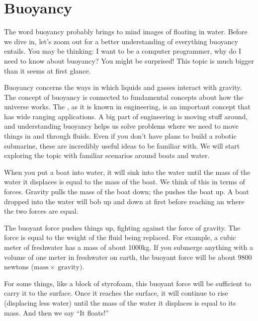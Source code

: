 \chapter{Buoyancy}

The word buoyancy probably brings to mind images of floating in water. Before we dive in, let's zoom out for a better understanding of everything buoyancy entails. You may be thinking: I want to be a computer programmer, why do I need to know about buoyancy? You might be surprised! This topic is much bigger than it seems at first glance. 

Buoyancy concerns the ways in which liquids and gasses interact with gravity. The concept of buoyancy is connected to fundamental concepts about how the universe works. The , as it is known in engineering, is an important concept that has wide ranging applications. A big part of engineering is moving stuff around, and understanding buoyancy helps us solve problems where we need to move things in and through fluids. Even if you don't have plans to build a robotic submarine, these are incredibly useful ideas to be familiar with. We will start exploring the topic with familiar scenarios around boats and water.

When you put a boat into water, it will sink into the water until
the mass of the water it displaces is equal to the mass of the
boat. We think of this in terms of forces. Gravity pulls the mass of
the boat down; the  pushes the boat up. A boat
dropped into the water will bob up and down at first before reaching an
 where the two forces are equal.

The buoyant force pushes things up, fighting against the force of
gravity. The force is equal to the weight of the fluid being
replaced. For example, a cubic meter of freshwater has a mass of
about 1000kg. If you submerge anything with a volume of one meter in
freshwater on earth, the buoyant force will be about 9800 newtons ($\text{mass} \times \ \text{gravity})$.

For some things, like a block of styrofoam, this buoyant force will be
sufficient to carry it to the surface. Once it reaches the surface, it
will continue to rise (displacing less water) until the mass of the
water it displaces is equal to its mass. And then we say ``It floats!''

